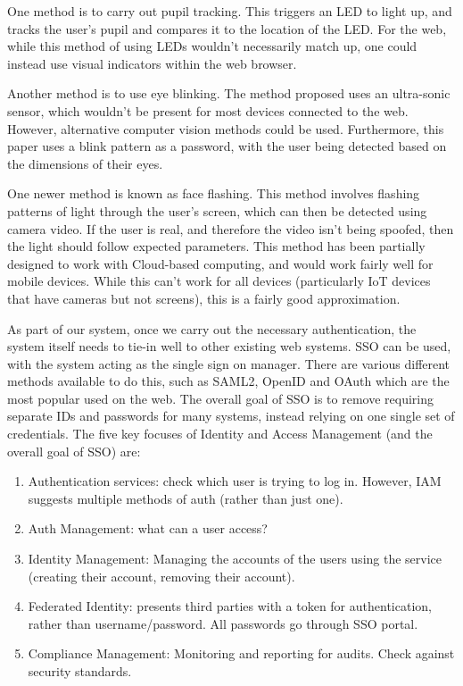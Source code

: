 \documentclass[14pt]{article}
\begin{document}
One method is to carry out pupil tracking. This triggers an LED to light up, and tracks the user's pupil and
compares it to the location of the LED.
\cite{LivenessTestPupilTracking} For the web, while this method of using LEDs wouldn't necessarily match up,
one could instead use visual indicators within the web browser. 

Another method is to use eye blinking. The method proposed uses an ultra-sonic sensor,
which wouldn't be present for most devices connected to the web. However, alternative computer vision methods could be used.
Furthermore, this paper uses a blink pattern as a password, with the user being detected based on the dimensions of their eyes.\cite{LivenessTestBlinking}

One newer method is known as face flashing. This method involves flashing patterns of light through the user's screen,
which can then be detected using camera video. If the user is real, and therefore the video isn't being spoofed, then
the light should follow expected parameters. This method has been partially designed to work with Cloud-based computing,
and would work fairly well for mobile devices. \cite{LivenessTestFaceFlashing} While this can't work for all devices (particularly IoT devices that have
cameras but not screens), this is a fairly good approximation. 


As part of our system, once we carry out the necessary authentication, the system itself needs to tie-in well to
other existing web systems. SSO can be used, with the system acting as the single sign on manager. There are various
different methods available to do this, such as SAML2, OpenID and OAuth which are the most popular used on the web. 
The overall goal of SSO is to remove requiring separate IDs and passwords for many systems, instead relying on one single
set of credentials. The five key focuses of Identity and Access Management (and the overall goal of SSO) are:

\begin{enumerate}
  \item Authentication services: check which user is trying to log in. However, IAM suggests multiple methods of auth (rather than just one).
  \item Auth Management: what can a user access?
  \item Identity Management: Managing the accounts of the users using the service (creating their account, removing their account).
  \item Federated Identity: presents third parties with a token for authentication, rather than username/password. All passwords go through SSO portal.
  \item Compliance Management: Monitoring and reporting for audits. Check against security standards.
\end{enumerate}
\cite{SSOOverview}
\end{document}
